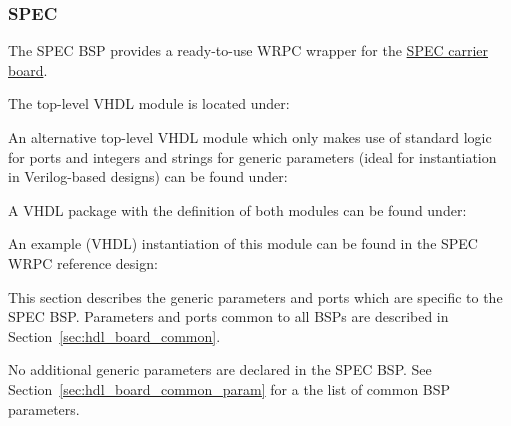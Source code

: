 \subsubsection{SPEC}
\label{sec:hdl_board_spec}

The SPEC BSP provides a ready-to-use WRPC wrapper for the
\href{https://gitlab.com/ohwr/project/spec/wikis}{SPEC carrier board}.

The top-level VHDL module is located under: \\

An alternative top-level VHDL module which only makes use of standard logic for ports and integers
and strings for generic parameters (ideal for instantiation in Verilog-based designs) can be found
under: \\

A VHDL package with the definition of both modules can be found under:
\\

An example (VHDL) instantiation of this module can be found in the SPEC WRPC reference design:
\\

This section describes the generic parameters and ports which are specific to the SPEC BSP.
Parameters and ports common to all BSPs are described in Section~\ref{sec:hdl_board_common}.


No additional generic parameters are declared in the SPEC BSP. See
Section~\ref{sec:hdl_board_common_param} for a the list of common BSP parameters.



